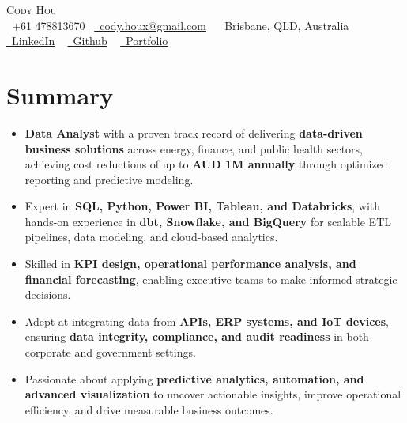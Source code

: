 \documentclass[letterpaper,11pt]{article}
\begin{document}
\begin{center}
  {\Huge \scshape Cody Hou} \\ \vspace{5pt}
  \small \raisebox{-0.1\height}\faPhone\ +61 478813670~ 
  \href{mailto:cody.houx@gmail.com}{\raisebox{-0.2\height}\faEnvelope\  \underline{cody.houx@gmail.com}} ~
  \faMapMarker\ Brisbane, QLD, Australia ~
  \href{https://www.linkedin.com/in/ce-hou}{\raisebox{-0.2\height}\faLinkedin\ \underline{LinkedIn}}  ~
  \href{https://github.com/DataCody}{\raisebox{-0.2\height}\faGithub\ \underline{Github}} ~
  \href{https://datacody.github.io/}{\raisebox{-0.2\height}\faGlobe\ \underline{Portfolio}}
  \vspace{-8pt}
\end{center}


\section{Summary}
\begin{itemize}[leftmargin=0.15in, label={•}]
\setlength{\itemsep}{-3pt}
    \item \textbf{Data Analyst} with a proven track record of delivering \textbf{data-driven business solutions} across energy, finance, and public health sectors, achieving cost reductions of up to \textbf{AUD 1M annually} through optimized reporting and predictive modeling.
    \item Expert in \textbf{SQL, Python, Power BI, Tableau, and Databricks}, with hands-on experience in \textbf{dbt, Snowflake, and BigQuery} for scalable ETL pipelines, data modeling, and cloud-based analytics.
    \item Skilled in \textbf{KPI design, operational performance analysis, and financial forecasting}, enabling executive teams to make informed strategic decisions.
    \item Adept at integrating data from \textbf{APIs, ERP systems, and IoT devices}, ensuring \textbf{data integrity, compliance, and audit readiness} in both corporate and government settings.
    \item Passionate about applying \textbf{predictive analytics, automation, and advanced visualization} to uncover actionable insights, improve operational efficiency, and drive measurable business outcomes.
\end{itemize}
\vspace{-15pt}
\end{document}
